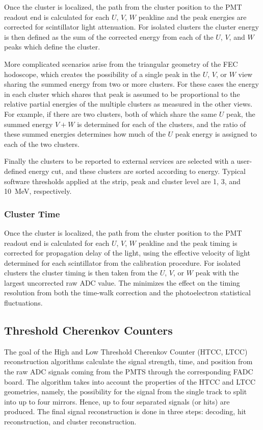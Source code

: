 \documentclass[3p,times,twocolumn]{elsarticle}
\begin{document}
Once the cluster is localized, the path from the cluster position to the PMT readout end is calculated for each $U$, $V$,
$W$ peakline and the peak energies are corrected for scintillator light attenuation.  For isolated clusters the cluster energy
is then defined as the sum of the corrected energy from each of the $U$, $V$, and $W$ peaks which define the cluster.

More complicated scenarios arise from the triangular geometry of the FEC hodoscope, which creates the possibility of a
single peak in the $U$, $V$, or $W$ view sharing the summed energy from two or more clusters.  For these cases the energy
in each cluster which shares that peak is assumed to be proportional to the relative partial energies of the multiple clusters as
measured in the other views.  For example, if there are two clusters, both of which share the same $U$ peak, the summed
energy $V+W$ is determined for each of the clusters, and the ratio of these summed energies determines how much of the
$U$ peak energy is assigned to each of the two clusters.

Finally the clusters to be reported to external services are selected with a user-defined energy cut, and these clusters
are sorted according to energy. Typical software thresholds applied at the strip, peak and cluster level are 1, 3, and 10~MeV,
respectively.

\subsubsection {Cluster Time}

Once the cluster is localized, the path from the cluster position to the PMT readout end is calculated for each $U$, $V$,
$W$ peakline and the peak timing is corrected for propagation delay of the light, using the effective velocity of light
determined for each scintillator from the calibration procedure.  For isolated clusters the cluster timing is then taken from
the $U$, $V$, or $W$ peak with the largest uncorrected raw ADC value.  The minimizes the effect on the timing resolution
from both the time-walk correction and the photoelectron statistical fluctuations.

\subsection{Threshold Cherenkov Counters}

The goal of the High and Low Threshold Cherenkov Counter (HTCC, LTCC) reconstruction algorithms
calculate the signal strength, time, and position from the
raw ADC signals coming from the PMTS through the corresponding FADC board. The algorithm takes into account
the properties of the HTCC and LTCC geometries, namely, the possibility for the signal from the single track to split into
up to four mirrors.
Hence, up to four separated signals (or hits) are produced. The final signal reconstruction is done in three
steps: decoding, hit reconstruction, and cluster reconstruction.
\end{document}
